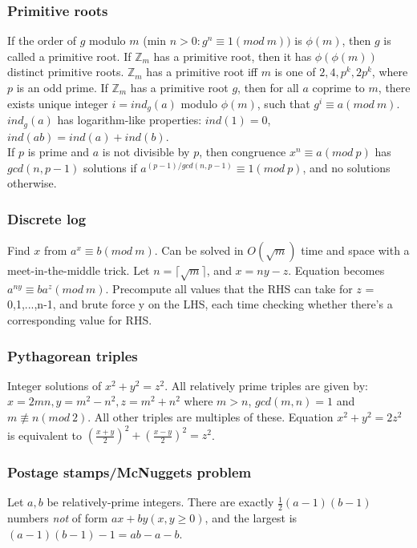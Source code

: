 \documentclass[a4paper,12pt]{article}
\begin{document}
\subsubsection{Primitive roots}
If the order of $g$ modulo $m$ (min $n > 0: g^n \equiv 1 (mod\ m))$ is $\phi(m)$, then $g$ is called a primitive root.
If $\mathbb{Z}_m$ has a primitive root, then it has $\phi(\phi(m))$ distinct primitive roots.
$\mathbb{Z}_m$ has a primitive root iff $m$ is one of $2, 4, p^k, 2p^k$, where $p$ is an odd prime. If $\mathbb{Z}_m$ has a primitive root $g$, then for all $a$ coprime to $m$, there exists unique integer $i = ind_g(a)$ modulo $\phi(m)$,
such that $g^i \equiv a (mod\ m)$. $ind_g(a)$ has logarithm-like properties: $ind(1) = 0$, $ind(ab) = ind(a) + ind(b)$.\\
If $p$ is prime and $a$ is not divisible by $p$, then congruence $x^n \equiv a (mod\ p)$ has $gcd(n, p - 1)$ solutions if $a^{(p-1)/ gcd(n,p-1)} \equiv 1 (mod\ p)$, and no solutions otherwise.

\subsubsection{Discrete log}
Find $x$ from $a^x \equiv b (mod\ m)$. Can be solved in $O(\sqrt{m})$ time and space with a meet-in-the-middle trick. Let $n = \lceil \sqrt{m} \rceil$, and $x = ny - z$. Equation becomes $a^{ny} \equiv ba^z (mod\ m)$.
Precompute all values that the RHS can take for $z$ = 0,1,...,n-1, and brute force y on the LHS, each time checking whether there’s a corresponding value for RHS.

\subsubsection{Pythagorean triples}
Integer solutions of $x^2 + y^2 = z^2$. All relatively prime triples are given by: $x = 2mn, y = m^2 - n^2, z = m^2 + n^2$ where $m > n$, $gcd(m,n) = 1$ and $m \not\equiv n (mod\ 2)$. All other triples
are multiples of these. Equation $x^2 + y^2 = 2z^2$ is equivalent to $(\frac{x+y}{2})^2 + (\frac{x-y}{2})^2 = z^2$.

\subsubsection{Postage stamps/McNuggets problem}
Let $a, b$ be relatively-prime integers. There are exactly $\frac{1}{2}(a-1)(b-1)$ numbers \emph{not} of form $ax + by (x,y \geq 0)$, and the largest is $(a-1)(b-1)-1 = ab-a-b$.
\end{document}
